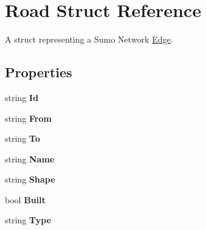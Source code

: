 \hypertarget{struct_road}{}\section{Road Struct Reference}
\label{struct_road}


A struct representing a Sumo Network \mbox{\hyperlink{class_edge}{Edge}}.  


\subsection*{Properties}
\begin{DoxyCompactItemize}
\item 
\mbox{\label{struct_road_a6678afc1976c8a4f31df86f477405d88}} 
string {\bfseries Id}
\item 
\mbox{\label{struct_road_a49e37b6d3aa49a7dd10d2a44c7499902}} 
string {\bfseries From}
\item 
\mbox{\label{struct_road_a12c9445b64ab9ad9b8474f869105410e}} 
string {\bfseries To}
\item 
\mbox{\label{struct_road_aefebfb290f424176b269f6a3cf7e9dd5}} 
string {\bfseries Name}
\item 
\mbox{\label{struct_road_a1a9a5739d0ce86eb2c72c346a0f7ad1f}} 
string {\bfseries Shape}
\item 
\mbox{\label{struct_road_a0b29109e7a699c4e3211d6b21130b45a}} 
bool {\bfseries Built}
\item 
\mbox{\label{struct_road_a29142c7b40b1588fdf2c65edc622882e}} 
string {\bfseries Type}

\end{DoxyCompactItemize}
